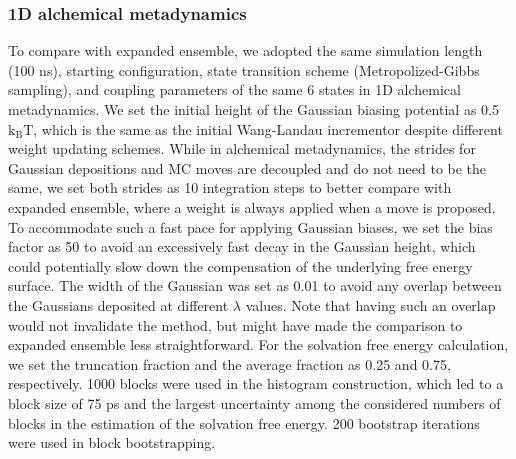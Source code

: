 \documentclass[journal=jacsat,manuscript=article]{achemso}
\begin{document}
\subsubsection{1D alchemical metadynamics}
To compare with expanded ensemble, we adopted the same simulation length (100 ns), starting configuration, state transition scheme (Metropolized-Gibbs sampling), and coupling parameters of the same 6 states in 1D alchemical metadynamics. We set the initial height of the Gaussian biasing potential as 0.5 $\text{k}_{\text{B}}\text{T}$, which is the same as the initial Wang-Landau incrementor despite different weight updating schemes. While in alchemical metadynamics, the strides for Gaussian depositions and MC moves are decoupled and do not need to be the same, we set both strides as 10 integration steps to better compare with expanded ensemble, where a weight is always applied when a move is proposed. To accommodate such a fast pace for applying Gaussian biases, we set the bias factor as 50 to avoid an excessively fast decay in the Gaussian height, which could potentially slow down the compensation of the underlying free energy surface. The width of the Gaussian was set as 0.01 to avoid any overlap between the Gaussians deposited at different $\lambda$ values. Note that having such an overlap would not invalidate the method, but might have made the comparison to expanded ensemble less straightforward. For the solvation free energy calculation, we set the truncation fraction and the average fraction as 0.25 and 0.75, respectively. 1000 blocks were used in the histogram construction, which led to a block size of 75 ps and the largest uncertainty among the considered numbers of blocks in the estimation of the solvation free energy. 200 bootstrap iterations were used in block bootstrapping. 
\end{document}
